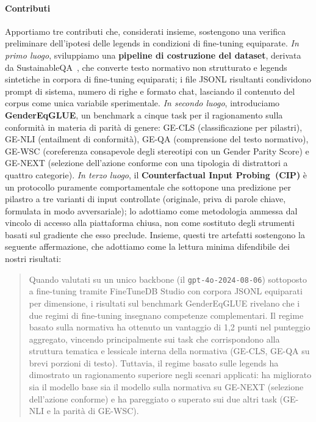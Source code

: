 \documentclass[pdflatex, sn-apa]{sn-jnl}%
\theoremstyle{thmstyleone}%
\theoremstyle{thmstyletwo}%
\theoremstyle{thmstylethree}%
\begin{document}
\paragraph{Contributi}
Apportiamo tre contributi che, considerati insieme, sostengono una verifica
preliminare dell'ipotesi delle legends in condizioni di fine-tuning equiparate.
\emph{In primo luogo}, sviluppiamo una \textbf{pipeline di costruzione del
dataset}, derivata da SustainableQA~\citep{wattenberg2025sustainableqa}, che
converte testo normativo non strutturato e legends sintetiche in corpora di
fine-tuning equiparati; i file JSONL risultanti condividono prompt di sistema,
numero di righe e formato chat, lasciando il contenuto del corpus come unica
variabile sperimentale. \emph{In secondo luogo}, introduciamo
\textbf{GenderEqGLUE}, un benchmark a cinque task per il ragionamento sulla
conformità in materia di parità di genere: GE-CLS (classificazione per pilastri),
GE-NLI (entailment di conformità), GE-QA (comprensione del testo normativo),
GE-WSC (coreferenza consapevole degli stereotipi con un Gender Parity Score) e
GE-NEXT (selezione dell'azione conforme con una tipologia di distrattori a quattro
categorie). \emph{In terzo luogo}, il \textbf{Counterfactual Input
Probing~(CIP)} è un protocollo puramente comportamentale che sottopone una
predizione per pilastro a tre varianti di input controllate (originale, priva di
parole chiave, formulata in modo avversariale); lo adottiamo come metodologia
ammessa dal vincolo di accesso alla piattaforma chiusa, non come sostituto degli
strumenti basati sul gradiente che esso preclude.
Insieme, questi tre artefatti sostengono la seguente affermazione, che adottiamo
come la lettura minima difendibile dei nostri risultati:

\begin{quote}
Quando valutati su un unico backbone (il \texttt{gpt-4o-2024-08-06}) sottoposto a
fine-tuning tramite FineTuneDB Studio con corpora JSONL equiparati per
dimensione, i risultati sul benchmark GenderEqGLUE rivelano che i due regimi di
fine-tuning insegnano competenze complementari. Il regime basato sulla normativa
ha ottenuto un vantaggio di 1,2 punti nel punteggio aggregato, vincendo
principalmente sui task che corrispondono alla struttura tematica e lessicale
interna della normativa (GE-CLS, GE-QA su brevi porzioni di testo). Tuttavia, il
regime basato sulle legends ha dimostrato un ragionamento superiore negli scenari
applicati: ha migliorato sia il modello base sia il modello sulla normativa su
GE-NEXT (selezione dell'azione conforme) e ha pareggiato o superato sui due altri
task (GE-NLI e la parità di GE-WSC).
\end{quote}
 
\end{document}
